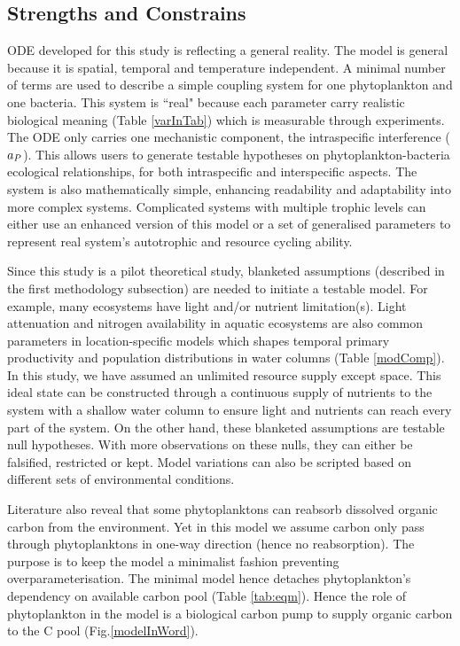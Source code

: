 \documentclass[../thesis.tex]{subfiles} %
\begin{document}
\subsection{Strengths and Constrains}
ODE developed for this study is reflecting a general reality.  The model is general because it is spatial, temporal and temperature independent.  A minimal number of terms are used to describe a simple coupling system for one phytoplankton and one bacteria.  This system is ``real" because each parameter carry realistic biological meaning (Table \ref{varInTab}) which is measurable through experiments.  The ODE only carries one mechanistic component, the intraspecific interference ($a_P$).  This allows users to generate testable hypotheses on phytoplankton-bacteria ecological relationships, for both intraspecific and interspecific aspects.  The system is also mathematically simple, enhancing readability and adaptability into more complex systems.  Complicated systems with multiple trophic levels can either use an enhanced version of this model or a set of generalised parameters to represent real system's autotrophic and resource cycling ability.

Since this study is a pilot theoretical study, blanketed assumptions (described in the first methodology subsection) are needed to initiate a testable model.  For example, many ecosystems have light and/or nutrient limitation(s).  Light attenuation and nitrogen availability in aquatic ecosystems are also common parameters in location-specific models which shapes temporal primary productivity and population distributions in water columns (Table \ref{modComp}).  In this study, we have assumed an unlimited resource supply except space.  This ideal state can be constructed through a continuous supply of nutrients to the system with a shallow water column to ensure light and nutrients can reach every part of the system.  On the other hand, these blanketed assumptions are testable null hypotheses.  With more observations on these nulls, they can either be falsified, restricted or kept.  Model variations can also be scripted based on different sets of environmental conditions.

Literature also reveal that some phytoplanktons can reabsorb dissolved organic carbon from the environment.\autocite{j1989respiration,samejima1958heterotrophic}  Yet in this model we assume carbon only pass through phytoplanktons in one-way direction (hence no reabsorption).  The purpose is to keep the model a minimalist fashion preventing overparameterisation.  The minimal model hence detaches phytoplankton's dependency on available carbon pool (Table \ref{tab:eqm}).  Hence the role of phytoplankton in the model is a biological carbon pump to supply organic carbon to the C pool (Fig.\ref{modelInWord}).
\end{document}

